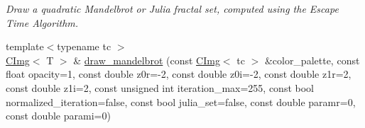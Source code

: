 \begin{DoxyCompactItemize}
\begin{DoxyCompactList}\small\item\em Draw a quadratic Mandelbrot or Julia fractal set, computed using the Escape Time Algorithm. \item\end{DoxyCompactList}\item 
\hypertarget{structcimg__library_1_1CImg_afcb419d5f82375b3be84bda414cb2e02}{
{\footnotesize template$<$typename tc $>$ }\\\hyperlink{structcimg__library_1_1CImg}{CImg}$<$ T $>$ \& \hyperlink{structcimg__library_1_1CImg_afcb419d5f82375b3be84bda414cb2e02}{draw\_\-mandelbrot} (const \hyperlink{structcimg__library_1_1CImg}{CImg}$<$ tc $>$ \&color\_\-palette, const float opacity=1, const double z0r=-\/2, const double z0i=-\/2, const double z1r=2, const double z1i=2, const unsigned int iteration\_\-max=255, const bool normalized\_\-iteration=false, const bool julia\_\-set=false, const double paramr=0, const double parami=0)}
\label{structcimg__library_1_1CImg_afcb419d5f82375b3be84bda414cb2e02}


\end{DoxyCompactItemize}
